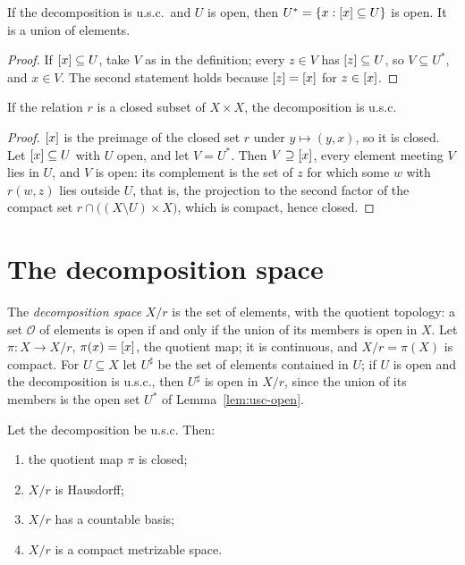 \begin{lemma}\label{lem:usc-open}
If the decomposition is u.s.c.\ and $U$ is open, then $U^*=\left\{ x:[x]\subseteq U \right\}$ is open. It is a
union of elements.
\end{lemma}

\begin{proof}
If $[x]\subseteq U$, take $V$ as in the definition; every $z\in V$ has $[z]\subseteq U$, so $V\subseteq
U^*$, and $x\in V$. The second statement holds because $[z]=[x]$ for $z\in[x]$.
\end{proof}


\begin{proposition}\label{prop:closed-usc}
If the relation $r$ is a closed subset of $X\times X$, the decomposition is u.s.c.
\end{proposition}

\begin{proof}
$[x]$ is the preimage of the closed set $r$ under $y\mapsto(y,x)$, so it is closed. Let $[x]\subseteq U$
with $U$ open, and let $V=U^*$. Then $V\supseteq[x]$, every element meeting $V$ lies in $U$, and $V$ is
open: its complement is the set of $z$ for which some $w$ with $r(w,z)$ lies outside $U$, that is, the
projection to the second factor of the compact set $r\cap\bigl((X\setminus U)\times X\bigr)$, which is
compact, hence closed.
\end{proof}


\section{The decomposition space}

The \emph{decomposition space} $X/r$ is the set of elements, with the quotient topology: a set
$\mathcal O$ of elements is open if and only if the union of its members is open in $X$. Let
$\pi\colon X\to X/r$, $\pi(x)=[x]$, the quotient map; it is continuous, and $X/r=\pi(X)$ is compact.
For $U\subseteq X$ let $U^\sharp$ be the set of elements contained in $U$; if $U$ is open and the
decomposition is u.s.c., then $U^\sharp$ is open in $X/r$, since the union of its members is the open
set $U^*$ of Lemma~\ref{lem:usc-open}.

\begin{theorem}\label{thm:quotient-metrizable}
Let the decomposition be u.s.c. Then:
\begin{enumerate}[label=(\alph*)]
\item the quotient map $\pi$ is closed;
\item $X/r$ is Hausdorff;
\item $X/r$ has a countable basis;
\item $X/r$ is a compact metrizable space.
\end{enumerate}
\end{theorem}

